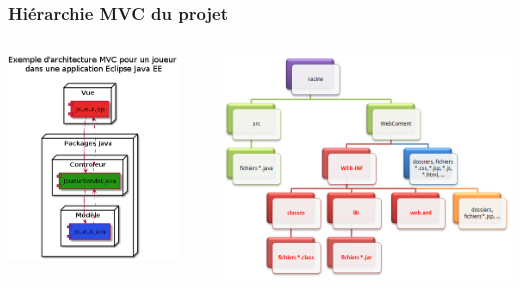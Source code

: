 \begin{frame}
    \frametitle{Hiérarchie MVC du projet}
    \begin{columns}
  		\begin{column}{3cm}
  		  	\includegraphics[scale=0.28]{images/exempleMVC.png}

  		\end{column}
  		  		\begin{column}{0.3cm}
  		  		\end{column}

  		\begin{column}{7cm}
  			\includegraphics[scale=0.3]{images/schemaProjetDynamic.png}
  		\end{column}
  	\end{columns}
\end{frame}
